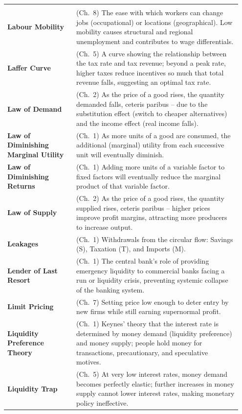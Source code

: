 \documentclass[11pt, a4paper, twoside]{book}
\begin{document}
\begin{longtable}{@{}>{\RaggedRight\arraybackslash}p{0.28\linewidth}>{\RaggedRight\arraybackslash}p{0.67\linewidth}@{}}
\multicolumn{2}{@{}l}{\textbf{\Large\color{CurveNavy} L}} \\[2pt]
\textbf{Labour Mobility} & (Ch.~8) The ease with which workers can change jobs (occupational) or locations (geographical). Low mobility causes structural and regional unemployment and contributes to wage differentials. \\
\textbf{Laffer Curve} & (Ch.~5) A curve showing the relationship between the tax rate and tax revenue; beyond a peak rate, higher taxes reduce incentives so much that total revenue falls, suggesting an optimal tax rate. \\
\textbf{Law of Demand} & (Ch.~2) As the price of a good rises, the quantity demanded falls, ceteris paribus -- due to the substitution effect (switch to cheaper alternatives) and the income effect (real income falls). \\
\textbf{Law of Diminishing Marginal Utility} & (Ch.~1) As more units of a good are consumed, the additional (marginal) utility from each successive unit will eventually diminish. \\
\textbf{Law of Diminishing Returns} & (Ch.~1) Adding more units of a variable factor to fixed factors will eventually reduce the marginal product of that variable factor. \\
\textbf{Law of Supply} & (Ch.~2) As the price of a good rises, the quantity supplied rises, ceteris paribus -- higher prices improve profit margins, attracting more producers to increase output. \\
\textbf{Leakages} & (Ch.~1) Withdrawals from the circular flow: Savings (S), Taxation (T), and Imports (M). \\
\textbf{Lender of Last Resort} & (Ch.~1) The central bank's role of providing emergency liquidity to commercial banks facing a run or liquidity crisis, preventing systemic collapse of the banking system. \\
\textbf{Limit Pricing} & (Ch.~7) Setting price low enough to deter entry by new firms while still earning supernormal profit. \\
\textbf{Liquidity Preference Theory} & (Ch.~1) Keynes' theory that the interest rate is determined by money demand (liquidity preference) and money supply; people hold money for transactions, precautionary, and speculative motives. \\
\textbf{Liquidity Trap} & (Ch.~5) At very low interest rates, money demand becomes perfectly elastic; further increases in money supply cannot lower interest rates, making monetary policy ineffective. \\

\end{longtable}
\end{document}
